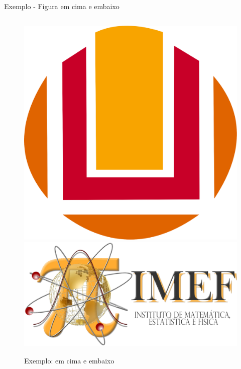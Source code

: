 \documentclass[c]{beamer}
\begin{document}
{\begin{frame}[fragile]{\sc Exemplo - Figura em cima e embaixo}
\begin{columns}
				\begin{column}{0.5\textwidth}
					\begin{figure}
						\centering
						\includegraphics[scale=0.15]{images/furg.png} \\
						\includegraphics[scale=0.1]{images/imef2.png}
						\caption{Exemplo: em cima e embaixo}
					\end{figure}
				\end{column}
			\end{columns}
\end{frame}
				
}
\end{document}
